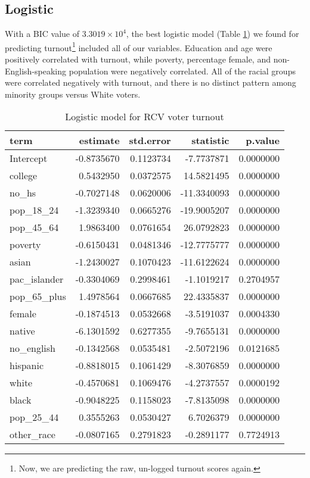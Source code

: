 \documentclass[12pt,twoside]{reedthesis}
\begin{document}
\hypertarget{logistic}{%
\subsection{Logistic}\label{logistic}}

With a BIC value of \(3.3019\times 10^{4}\), the best logistic model (Table \ref{tab:logit-turnout-model}) we found for predicting turnout\footnote{Now, we are predicting the raw, un-logged turnout scores again.} included all of our variables. Education and age were positively correlated with turnout, while poverty, percentage female, and non-English-speaking population were negatively correlated. All of the racial groups were correlated negatively with turnout, and there is no distinct pattern among minority groups versus White voters.
\begin{table}[t]

\caption[Logit turnout model]{\label{tab:logit-turnout-model}Logistic model for RCV voter turnout}
\centering
\begin{tabular}{lrrrr}
\toprule
term & estimate & std.error & statistic & p.value\\
\midrule
Intercept & -0.8735670 & 0.1123734 & -7.7737871 & 0.0000000\\
college & 0.5432950 & 0.0372575 & 14.5821495 & 0.0000000\\
no\_hs & -0.7027148 & 0.0620006 & -11.3340093 & 0.0000000\\
pop\_18\_24 & -1.3239340 & 0.0665276 & -19.9005207 & 0.0000000\\
pop\_45\_64 & 1.9863400 & 0.0761654 & 26.0792823 & 0.0000000\\
\addlinespace
poverty & -0.6150431 & 0.0481346 & -12.7775777 & 0.0000000\\
asian & -1.2430027 & 0.1070423 & -11.6122624 & 0.0000000\\
pac\_islander & -0.3304069 & 0.2998461 & -1.1019217 & 0.2704957\\
pop\_65\_plus & 1.4978564 & 0.0667685 & 22.4335837 & 0.0000000\\
female & -0.1874513 & 0.0532668 & -3.5191037 & 0.0004330\\
\addlinespace
native & -6.1301592 & 0.6277355 & -9.7655131 & 0.0000000\\
no\_english & -0.1342568 & 0.0535481 & -2.5072196 & 0.0121685\\
hispanic & -0.8818015 & 0.1061429 & -8.3076859 & 0.0000000\\
white & -0.4570681 & 0.1069476 & -4.2737557 & 0.0000192\\
black & -0.9048225 & 0.1158023 & -7.8135098 & 0.0000000\\
\addlinespace
pop\_25\_44 & 0.3555263 & 0.0530427 & 6.7026379 & 0.0000000\\
other\_race & -0.0807165 & 0.2791823 & -0.2891177 & 0.7724913\\
\bottomrule
\end{tabular}
\end{table}
\end{document}
